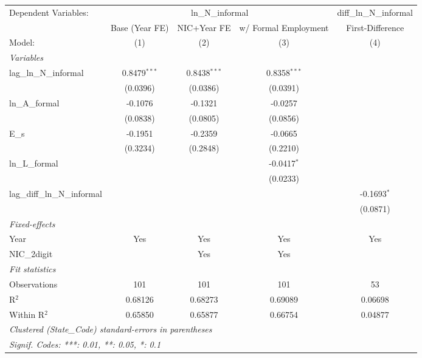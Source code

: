 
\begingroup
\centering
\begin{tabular}{lcccc}
   \tabularnewline \midrule \midrule
   Dependent Variables: & \multicolumn{3}{c}{ln\_N\_informal} & diff\_ln\_N\_informal\\
                                  & Base (Year FE) & NIC+Year FE    & w/ Formal Employment & First-Difference \\   
   Model:                         & (1)            & (2)            & (3)                  & (4)\\  
   \midrule
   \emph{Variables}\\
   lag\_ln\_N\_informal           & 0.8479$^{***}$ & 0.8438$^{***}$ & 0.8358$^{***}$       &   \\   
                                  & (0.0396)       & (0.0386)       & (0.0391)             &   \\   
   ln\_A\_formal                  & -0.1076        & -0.1321        & -0.0257              &   \\   
                                  & (0.0838)       & (0.0805)       & (0.0856)             &   \\   
   E\_s                           & -0.1951        & -0.2359        & -0.0665              &   \\   
                                  & (0.3234)       & (0.2848)       & (0.2210)             &   \\   
   ln\_L\_formal                  &                &                & -0.0417$^{*}$        &   \\   
                                  &                &                & (0.0233)             &   \\   
   lag\_diff\_ln\_N\_informal     &                &                &                      & -0.1693$^{*}$\\   
                                  &                &                &                      & (0.0871)\\   
   \midrule
   \emph{Fixed-effects}\\
   Year                           & Yes            & Yes            & Yes                  & Yes\\  
   NIC\_2digit                    &                & Yes            & Yes                  & \\  
   \midrule
   \emph{Fit statistics}\\
   Observations                   & 101            & 101            & 101                  & 53\\  
   R$^2$                          & 0.68126        & 0.68273        & 0.69089              & 0.06698\\  
   Within R$^2$                   & 0.65850        & 0.65877        & 0.66754              & 0.04877\\  
   \midrule \midrule
   \multicolumn{5}{l}{\emph{Clustered (State\_Code) standard-errors in parentheses}}\\
   \multicolumn{5}{l}{\emph{Signif. Codes: ***: 0.01, **: 0.05, *: 0.1}}\\
\end{tabular}
\par\endgroup


